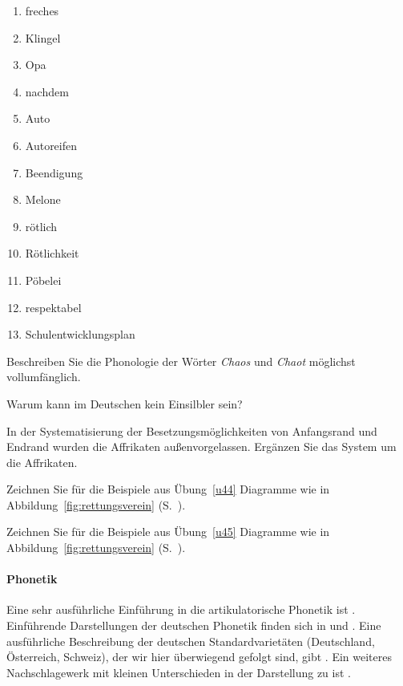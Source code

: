 \begin{enumerate}\Lf
  \item freches
  \item Klingel
  \item Opa
  \item nachdem
  \item Auto
  \item Autoreifen
  \item Beendigung
  \item Melone
  \item rötlich
  \item Rötlichkeit
  \item Pöbelei
  \item respektabel
  \item Schulentwicklungsplan
\end{enumerate}

\Uebung[\tristar] \label{u46} Beschreiben Sie die Phonologie der Wörter \textit{Chaos} und \textit{Chaot} möglichst vollumfänglich.

\Uebung \label{u47} Warum kann \textipa{[s5]} im Deutschen kein Einsilbler sein?

\Uebung[\tristar] \label{u48} In der Systematisierung der Besetzungsmöglichkeiten von Anfangsrand und Endrand wurden die Affrikaten außenvorgelassen.
Ergänzen Sie das System um die Affrikaten.

\Uebung[\tristar] \label{u49} Zeichnen Sie für die Beispiele aus Übung~\ref{u44} Diagramme wie in Abbildung~\ref{fig:rettungsverein} (S.~\pageref{fig:rettungsverein}).

\Uebung[\tristar] \label{u50} Zeichnen Sie für die Beispiele aus Übung~\ref{u45} Diagramme wie in Abbildung~\ref{fig:rettungsverein} (S.~\pageref{fig:rettungsverein}).


\WeitereLiteratur

\paragraph*{Phonetik}

Eine sehr ausführliche Einführung in die artikulatorische Phonetik ist \citet{Laver94}.
Einführende Darstellungen der deutschen Phonetik finden sich \zB in \citet{RRKWS09} und \citet{Wiese10}.
Eine ausführliche Beschreibung der deutschen Standardvarietäten (Deutschland, Österreich, Schweiz), der wir hier überwiegend gefolgt sind, gibt \citet{Krech-ea2009}.
Ein weiteres Nachschlagewerk mit kleinen Unterschieden in der Darstellung zu \citealp{Krech-ea2009} ist \citet{Mangold06}.

